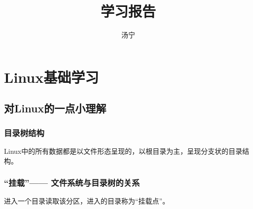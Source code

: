 \documentclass[12pt]{article}
\begin{document}
\title{\vspace{-2em}学习报告\vspace{-0.7em}}
\author{汤宁}
\date{}
\maketitle\thispagestyle{fancy}
\maketitle
\tableofcontents

\section{Linux基础学习}
\subsection{对Linux的一点小理解}
\begin{flushleft}
\subsubsection{目录树结构}
Linux中的所有数据都是以文件形态呈现的，以根目录为主，呈现分支状的目录结构。
\end{flushleft}
\subsubsection{“挂载”——{} 文件系统与目录树的关系}
\begin{flushleft}
进入一个目录读取该分区，进入的目录称为“挂载点”。
\end{flushleft}
\end{document}
